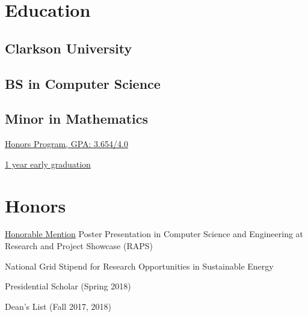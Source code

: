 \documentclass[]{deedy-resume-openfont}
\begin{document}
%
%

%
%


%
%

\begin{minipage}[t]{0.33\textwidth} 


\section{Education}
\subsection{\Large{}{Clarkson University}}
\subsection{BS in Computer Science}
\subsection{\normalsize{Minor in Mathematics}}
\sectionsep
\begin{tightemize}
\item \underline{Honors Program, GPA: 3.654/4.0}
\item \underline{1 year early graduation}

\end{tightemize}
\sectionsep

\section{Honors}
\sectionsep
\begin{tightemize}
\item \underline{Honorable Mention} Poster Presentation in Computer Science and Engineering at Research and Project Showcase (RAPS)
\item National Grid Stipend for Research Opportunities in Sustainable Energy
\item Presidential Scholar (Spring 2018)
\item Dean's List (Fall 2017, 2018)
\end{tightemize}


\end{minipage}
\end{document}

